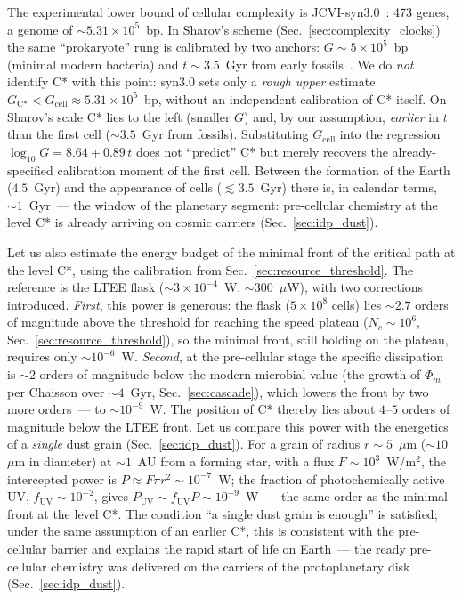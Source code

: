 \documentclass[11pt,a4paper]{article}
\begin{document}
The experimental lower bound of cellular complexity is JCVI-syn3.0~\cite{Hutchison2016}: 473 genes, a genome of $\sim 5.31\times10^{5}$~bp. In Sharov's scheme (Sec.~\ref{sec:complexity_clocks}) the same ``prokaryote'' rung is calibrated by two anchors: $G \sim 5\times10^{5}$~bp (minimal modern bacteria) and $t \sim 3.5$~Gyr from early fossils~\cite{Sharov,Sharov2013}. We do \emph{not} identify C* with this point: syn3.0 sets only a \emph{rough upper} estimate $G_{\text{C*}} < G_{\text{cell}} \approx 5.31\times10^{5}$~bp, without an independent calibration of C* itself. On Sharov's scale C* lies to the left (smaller $G$) and, by our assumption, \emph{earlier} in $t$ than the first cell ($\sim 3.5$~Gyr from fossils). Substituting $G_{\text{cell}}$ into the regression $\log_{10}G = 8.64 + 0.89\,t$ does not ``predict'' C* but merely recovers the already-specified calibration moment of the first cell. Between the formation of the Earth ($4.5$~Gyr) and the appearance of cells ($\lesssim 3.5$~Gyr) there is, in calendar terms, $\sim 1$~Gyr~--- the window of the planetary segment: pre-cellular chemistry at the level C* is already arriving on cosmic carriers (Sec.~\ref{sec:idp_dust}).

Let us also estimate the energy budget of the minimal front of the critical path at the level C*, using the calibration from Sec.~\ref{sec:resource_threshold}. The reference is the LTEE flask ($\sim 3 \times 10^{-4}$~W, $\sim 300$~$\mu$W), with two corrections introduced. \emph{First}, this power is generous: the flask ($5\times10^{8}$ cells) lies $\sim 2.7$ orders of magnitude above the threshold for reaching the speed plateau ($N_c\sim 10^{6}$, Sec.~\ref{sec:resource_threshold}), so the minimal front, still holding on the plateau, requires only $\sim 10^{-6}$~W. \emph{Second}, at the pre-cellular stage the specific dissipation is $\sim 2$ orders of magnitude below the modern microbial value (the growth of $\Phi_m$ per Chaisson over $\sim 4$~Gyr, Sec.~\ref{sec:cascade}), which lowers the front by two more orders~--- to $\sim 10^{-9}$~W. The position of C* thereby lies about $4$--$5$ orders of magnitude below the LTEE front. Let us compare this power with the energetics of a \emph{single} dust grain (Sec.~\ref{sec:idp_dust}). For a grain of radius $r \sim 5$~$\mu$m ($\sim 10$~$\mu$m in diameter) at $\sim 1$~AU from a forming star, with a flux $F \sim 10^3$~W/m$^2$, the intercepted power is $P \approx F\pi r^2 \sim 10^{-7}$~W; the fraction of photochemically active UV, $f_{\mathrm{UV}} \sim 10^{-2}$, gives $P_{\mathrm{UV}} \sim f_{\mathrm{UV}} P \sim 10^{-9}$~W~--- the same order as the minimal front at the level C*. The condition ``a single dust grain is enough'' is satisfied; under the same assumption of an earlier C*, this is consistent with the pre-cellular barrier and explains the rapid start of life on Earth~--- the ready pre-cellular chemistry was delivered on the carriers of the protoplanetary disk (Sec.~\ref{sec:idp_dust}).
\end{document}
